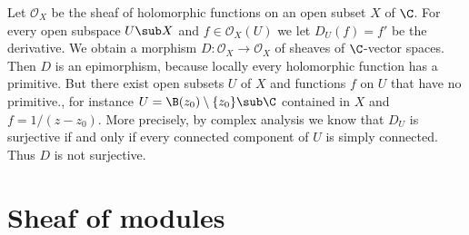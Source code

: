 \begin{example}\label{sheaf cat epi not surjective on object}
Let $\mathcal{O}_X$ be the sheaf of holomorphic functions on an open subset $X$ of $\C$. For every open subspace $U\sub X$ and $f\in\mathcal{O}_X(U)$ we let $D_U(f)=f'$ be the derivative. We obtain a morphism $D:\mathcal{O}_X\to\mathcal{O}_X$ of sheaves of $\C$-vector spaces. Then $D$ is an epimorphism, because locally every holomorphic function has a primitive. But there exist open subsets $U$ of $X$ and functions $f$ on $U$ that have no primitive., for instance $U=\B(z_0)\setminus\{z_0\}\sub\C$ contained in $X$ and $f=1/(z-z_0)$. More precisely, by complex analysis we know that $D_U$ is surjective if and only if every connected component of $U$ is simply connected. Thus $D$ is not surjective.
\end{example}
\section{Sheaf of modules}
